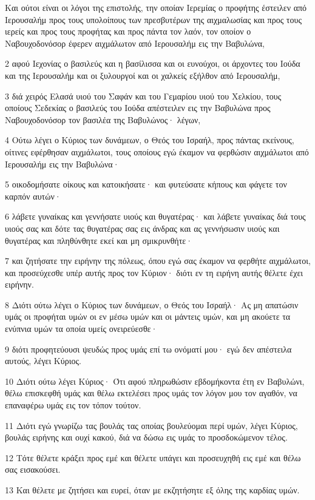 \par Και ούτοι είναι οι λόγοι της επιστολής, την οποίαν Ιερεμίας ο προφήτης έστειλεν από Ιερουσαλήμ προς τους υπολοίπους των πρεσβυτέρων της αιχμαλωσίας και προς τους ιερείς και προς τους προφήτας και προς πάντα τον λαόν, τον οποίον ο Ναβουχοδονόσορ έφερεν αιχμάλωτον από Ιερουσαλήμ εις την Βαβυλώνα,
\par 2 αφού Ιεχονίας ο βασιλεύς και η βασίλισσα και οι ευνούχοι, οι άρχοντες του Ιούδα και της Ιερουσαλήμ και οι ξυλουργοί και οι χαλκείς εξήλθον από Ιερουσαλήμ,
\par 3 διά χειρός Ελασά υιού του Σαφάν και του Γεμαρίου υιού του Χελκίου, τους οποίους Σεδεκίας ο βασιλεύς του Ιούδα απέστειλεν εις την Βαβυλώνα προς Ναβουχοδονόσορ τον βασιλέα της Βαβυλώνος· λέγων,
\par 4 Ούτω λέγει ο Κύριος των δυνάμεων, ο Θεός του Ισραήλ, προς πάντας εκείνους, οίτινες εφέρθησαν αιχμάλωτοι, τους οποίους εγώ έκαμον να φερθώσιν αιχμάλωτοι από Ιερουσαλήμ εις την Βαβυλώνα·
\par 5 οικοδομήσατε οίκους και κατοικήσατε· και φυτεύσατε κήπους και φάγετε τον καρπόν αυτών·
\par 6 λάβετε γυναίκας και γεννήσατε υιούς και θυγατέρας· και λάβετε γυναίκας διά τους υιούς σας και δότε τας θυγατέρας σας εις άνδρας και ας γεννήσωσιν υιούς και θυγατέρας και πληθύνθητε εκεί και μη σμικρυνθήτε·
\par 7 και ζητήσατε την ειρήνην της πόλεως, όπου εγώ σας έκαμον να φερθήτε αιχμάλωτοι, και προσεύχεσθε υπέρ αυτής προς τον Κύριον· διότι εν τη ειρήνη αυτής θέλετε έχει ειρήνην.
\par 8 Διότι ούτω λέγει ο Κύριος των δυνάμεων, ο Θεός του Ισραήλ· Ας μη απατώσιν υμάς οι προφήται υμών οι εν μέσω υμών και οι μάντεις υμών, και μη ακούετε τα ενύπνια υμών τα οποία υμείς ονειρεύεσθε·
\par 9 διότι προφητεύουσι ψευδώς προς υμάς επί τω ονόματί μου· εγώ δεν απέστειλα αυτούς, λέγει Κύριος.
\par 10 Διότι ούτω λέγει Κύριος· Ότι αφού πληρωθώσιν εβδομήκοντα έτη εν Βαβυλώνι, θέλω επισκεφθή υμάς και θέλω εκτελέσει προς υμάς τον λόγον μου τον αγαθόν, να επαναφέρω υμάς εις τον τόπον τούτον.
\par 11 Διότι εγώ γνωρίζω τας βουλάς τας οποίας βουλεύομαι περί υμών, λέγει Κύριος, βουλάς ειρήνης και ουχί κακού, διά να δώσω εις υμάς το προσδοκώμενον τέλος.
\par 12 Τότε θέλετε κράξει προς εμέ και θέλετε υπάγει και προσευχηθή εις εμέ και θέλω σας εισακούσει.
\par 13 Και θέλετε με ζητήσει και ευρεί, όταν με εκζητήσητε εξ όλης της καρδίας υμών.
